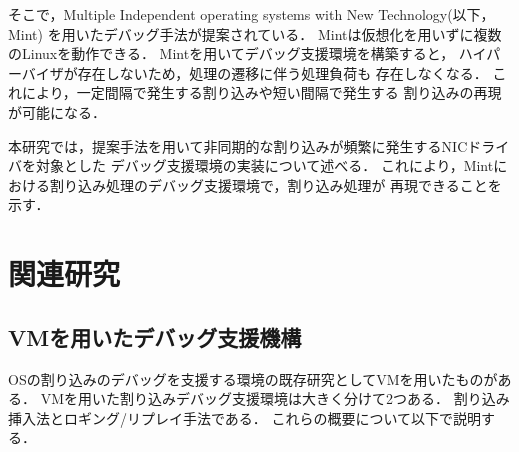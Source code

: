 \documentclass[submit,techreq,noauthor,dvipdfmx]{ipsj}
\begin{document}
そこで，Multiple Independent operating systems with New Technology(以下，Mint)\cite{senzaki}
を用いたデバッグ手法が提案されている．
Mintは仮想化を用いずに複数のLinuxを動作できる．
Mintを用いてデバッグ支援環境を構築すると，
ハイパーバイザが存在しないため，処理の遷移に伴う処理負荷も
存在しなくなる．
これにより，一定間隔で発生する割り込みや短い間隔で発生する
割り込みの再現が可能になる．

本研究では，提案手法を用いて非同期的な割り込みが頻繁に発生するNICドライバを対象とした
デバッグ支援環境の実装について述べる．
これにより，Mintにおける割り込み処理のデバッグ支援環境で，割り込み処理が
再現できることを示す．


\section{関連研究}\label{chap:related_reserch}

\subsection{VMを用いたデバッグ支援機構}\label{sec:debugging_support_mechanism_with_VM}

OSの割り込みのデバッグを支援する環境の既存研究としてVMを用いたものがある．
VMを用いた割り込みデバッグ支援環境は大きく分けて2つある．
割り込み挿入法\cite{miyahara}とロギング/リプレイ手法\cite{samuel}\cite{jim}\cite{kawasaki}である．
これらの概要について以下で説明する．
\end{document}
